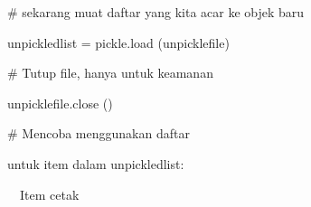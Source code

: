 \noindent 
\vspace{10pt}
\noindent 
{\fontsize{10pt}{10pt}\selectfont  $  \#  $ sekarang muat daftar yang kita acar ke objek baru} \par
\noindent 
{\fontsize{10pt}{10pt}\selectfont unpickledlist = pickle.load (unpicklefile)} \par
\noindent 
\vspace{10pt}
\noindent 
{\fontsize{10pt}{10pt}\selectfont  $  \#  $ Tutup file, hanya untuk keamanan} \par
\noindent 
{\fontsize{10pt}{10pt}\selectfont unpicklefile.close ()} \par
\noindent 
\vspace{10pt}
\noindent 
{\fontsize{10pt}{10pt}\selectfont  $  \#  $ Mencoba menggunakan daftar} \par
\noindent 
{\fontsize{10pt}{10pt}\selectfont untuk item dalam unpickledlist:} \par
\noindent 
{\fontsize{10pt}{10pt}\selectfont  $  $ $  $ $  $ $  $Item cetak} \par
\vspace{14pt}
